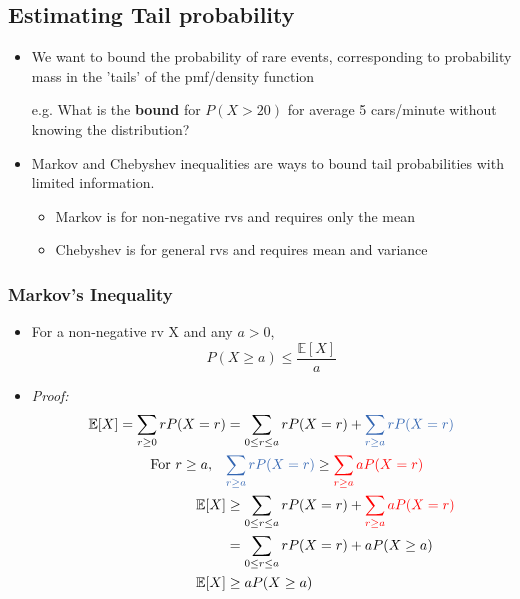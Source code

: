 \documentclass[24pt]{article}
\begin{document}
\subsection{Estimating Tail probability}
\begin{itemize}
\item We want to bound the probability of rare events, corresponding to probability mass in the 'tails' of the pmf/density function
\begin{itemize}
e.g. What is the \textbf{bound} for $P(X>20)$ for average 5 cars/minute without knowing the distribution?
\end{itemize}
\item Markov and Chebyshev inequalities are ways to bound tail probabilities with limited information.
\begin{itemize}
\item Markov is for non-negative rvs and requires only the mean
\item Chebyshev is for general rvs and requires mean and variance
\end{itemize}
\end{itemize}

\subsubsection{Markov's Inequality}
\begin{itemize}
\item For a non-negative rv X and any $a > 0$,
$$ P(X \ge a) \le \frac{\mathbb{E}[X]}{a}$$ 
\item \textit{Proof:}
\begin{align*}
\mathbb{E}[X] = \sum_{r\ge0}rP(X=r) &= \sum_{0\le r\le a}rP(X=r) + \textcolor{blue1}{\sum_{r\ge a}rP(X=r)} \\
\textrm{For }r \ge a, \quad &\textcolor{blue1}{\sum_{r\ge a}rP(X=r)} \ge \textcolor{red}{\sum_{r\ge a}aP(X=r)} \\
\mathbb{E}[X] &\ge  \sum_{0\le r\le a}rP(X=r) + \textcolor{red}{\sum_{r\ge a}aP(X=r)} \\
&= \sum_{0\le r\le a}rP(X=r) + aP(X \ge a)\\
\mathbb{E}[X] &\ge  aP(X \ge a)
\end{align*}
\end{itemize}
\end{document}
